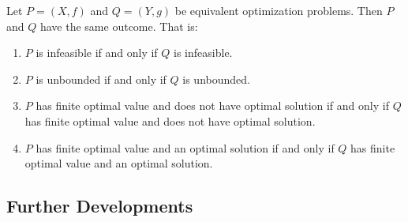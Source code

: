 \documentclass[a4paper]{article}
\begin{document}
\begin{lemma}
  Let \(P=(X,f)\) and \(Q=(Y,g)\) be equivalent optimization problems. Then \(P\)
  and \(Q\) have the same outcome. That is:
  \begin{enumerate}[label=(\roman*)]
  \item \(P\) is infeasible if and only if \(Q\) is infeasible.
  \item \(P\) is unbounded if and only if \(Q\) is unbounded.
  \item \(P\) has finite optimal value and does not have optimal solution if and
    only if \(Q\) has finite optimal value and does not have optimal solution.
  \item \(P\) has finite optimal value and an optimal solution if and only if
    \(Q\) has finite optimal value and an optimal solution.   
  \end{enumerate}
\end{lemma}
\subsection*{Further Developments}
\end{document}
